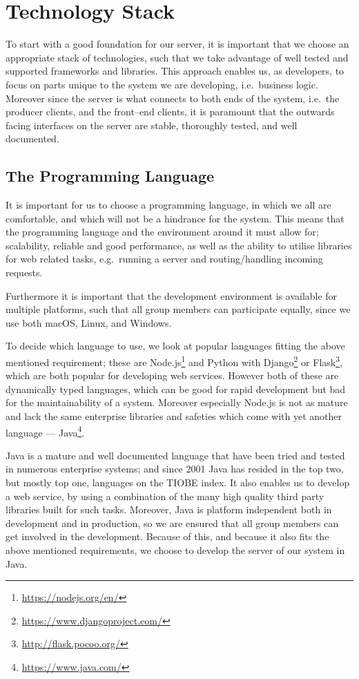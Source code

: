 \section{Technology Stack}
To start with a good foundation for our server, it is important that we choose an appropriate stack of technologies, such that we take advantage of well tested and supported frameworks and libraries.
This approach enables us, as developers, to focus on parts unique to the system we are developing, i.e.~business logic.
Moreover since the server is what connects to both ends of the system, i.e.~the producer clients, and the front--end clients, it is paramount that the outwards facing interfaces on the server are stable, thoroughly tested, and well documented.

\subsection{The Programming Language}
It is important for us to choose a programming language, in which we all are comfortable, and which will not be a hindrance for the system.
This means that the programming language and the environment around it must allow for; scalability, reliable and good performance, as well as the ability to utilise libraries for web related tasks, e.g.~running a server and routing/handling incoming requests.

Furthermore it is important that the development environment is available for multiple platforms, such that all group members can participate equally, since we use both macOS, Linux, and Windows.

\bigskip
To decide which language to use, we look at popular languages fitting the above mentioned requirement;
these are Node.js\footnote{\url{https://nodejs.org/en/}} and Python with Django\footnote{\url{https://www.djangoproject.com/}} or Flask\footnote{\url{http://flask.pocoo.org/}}, which are both popular for developing web services.
However both of these are dynamically typed languages, which can be good for rapid development but bad for the maintainability of a system\cite{kleinschmager2012static}.
Moreover especially Node.js is not as mature and lack the same enterprise libraries and safeties which come with yet another language --- Java\footnote{\url{https://www.java.com/}}.

Java is a mature and well documented language that have been tried and tested in numerous enterprise systems; and since 2001 Java has resided in the top two, but mostly top one, languages on the TIOBE index\cite{TiobeIndex}.
It also enables us to develop a web service, by using a combination of the many high quality third party libraries built for such tasks.
Moreover, Java is platform independent both in development and in production, so we are ensured that all group members can get involved in the development.
Because of this, and because it also fits the above mentioned requirements, we choose to develop the server of our system in Java.


